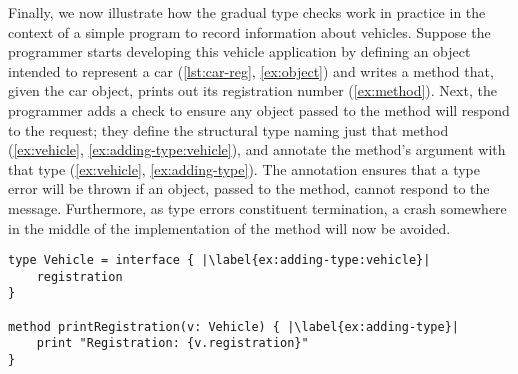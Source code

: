 Finally,
we now illustrate how the gradual type checks work in practice
in the context of a simple program to record information about vehicles.
Suppose the programmer starts developing this vehicle
application by defining an object intended to represent a car
(\cref{lst:car-reg}, \cref{ex:object}) and writes a method that, given
the car object, prints out its registration number (\cref{ex:method}).
%
Next, the programmer adds a check to ensure any object passed to the
 method will respond to the
 request; 
they define the structural type \citep{theCleanVehicle}
naming just that method (\cref{ex:vehicle}, \cref{ex:adding-type:vehicle}), 
and annotate the  method's
argument with that type (\cref{ex:vehicle}, \cref{ex:adding-type}).
The annotation ensures that a type error will be thrown if an object,
passed to the  method,
cannot respond to the  message.
Furthermore, as type errors constituent termination, 
a crash somewhere in the middle of the
implementation of the  method
will now be avoided.

\begin{lstlisting}[label={ex:vehicle},caption={Adding a type annotation to a method parameter.},escapechar=|,columns=flexible,float,floatplacement=H]
type Vehicle = interface { |\label{ex:adding-type:vehicle}|
    registration    
}

method printRegistration(v: Vehicle) { |\label{ex:adding-type}|
    print "Registration: {v.registration}"
}
\end{lstlisting}




